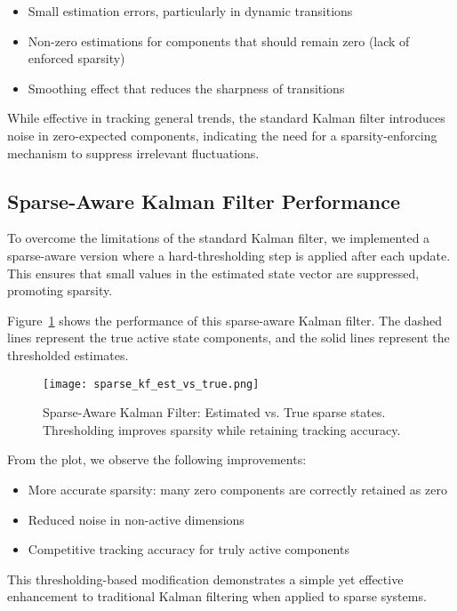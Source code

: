 \documentclass[12pt]{article}
\begin{document}
\begin{itemize}
  \item Small estimation errors, particularly in dynamic transitions
  \item Non-zero estimations for components that should remain zero (lack of enforced sparsity)
  \item Smoothing effect that reduces the sharpness of transitions
\end{itemize}

While effective in tracking general trends, the standard Kalman filter introduces noise in zero-expected components, indicating the need for a sparsity-enforcing mechanism to suppress irrelevant fluctuations.

\subsection{Sparse-Aware Kalman Filter Performance}
To overcome the limitations of the standard Kalman filter, we implemented a sparse-aware version where a hard-thresholding step is applied after each update. This ensures that small values in the estimated state vector are suppressed, promoting sparsity.

Figure~\ref{fig:sparse-kf} shows the performance of this sparse-aware Kalman filter. The dashed lines represent the true active state components, and the solid lines represent the thresholded estimates.

\begin{figure}[h!]
  \centering
  \texttt{[image: sparse\_kf\_est\_vs\_true.png]}
  \caption{Sparse-Aware Kalman Filter: Estimated vs. True sparse states. Thresholding improves sparsity while retaining tracking accuracy.}
  \label{fig:sparse-kf}
\end{figure}

From the plot, we observe the following improvements:
\begin{itemize}
  \item More accurate sparsity: many zero components are correctly retained as zero
  \item Reduced noise in non-active dimensions
  \item Competitive tracking accuracy for truly active components
\end{itemize}

This thresholding-based modification demonstrates a simple yet effective enhancement to traditional Kalman filtering when applied to sparse systems.
\end{document}
